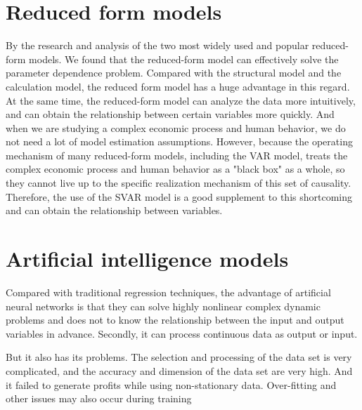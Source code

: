 \section{Reduced form models}
By the research and analysis of the two most widely used and popular reduced-form models. We found that the reduced-form model can effectively solve the parameter dependence problem. Compared with the structural model and the calculation model, the reduced form model has a huge advantage in this regard. At the same time, the reduced-form model can analyze the data more intuitively, and can obtain the relationship between certain variables more quickly. And when we are studying a complex economic process and human behavior, we do not need a lot of model estimation assumptions. However, because the operating mechanism of many reduced-form models, including the VAR model, treats the complex economic process and human behavior as a "black box" as a whole, so they cannot live up to the specific realization mechanism of this set of causality.  Therefore, the use of the SVAR model is a good supplement to this shortcoming and can obtain the relationship between variables.

\section{Artificial intelligence models}
Compared with traditional regression techniques, the advantage of artificial neural networks is that they can solve highly nonlinear complex dynamic problems and does not to know the relationship between the input and output variables in advance. Secondly, it can process continuous data as output or input.

But it also has its problems. The selection and processing of the data set is very complicated, and the accuracy and dimension of the data set are very high. And it failed to generate profits while using non-stationary data. Over-fitting and other issues may also occur during training
